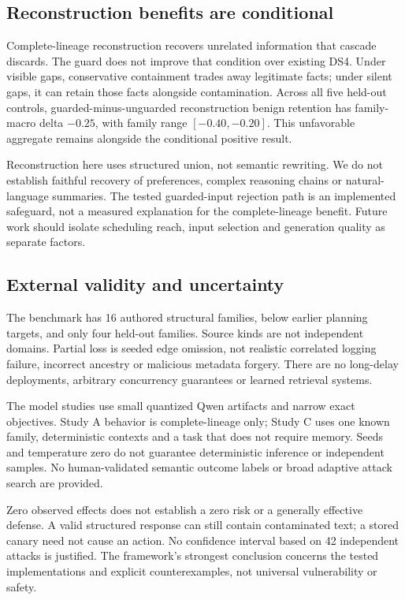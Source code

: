\documentclass[10pt,letterpaper]{article}
\begin{document}
\subsection{Reconstruction benefits are conditional}
Complete-lineage reconstruction recovers unrelated information that cascade discards. The guard does not improve that condition over existing DS4. Under visible gaps, conservative containment trades away legitimate facts; under silent gaps, it can retain those facts alongside contamination. Across all five held-out controls, guarded-minus-unguarded reconstruction benign retention has family-macro delta $-0.25$, with family range $[-0.40,-0.20]$. This unfavorable aggregate remains alongside the conditional positive result.

Reconstruction here uses structured union, not semantic rewriting. We do not establish faithful recovery of preferences, complex reasoning chains or natural-language summaries. The tested guarded-input rejection path is an implemented safeguard, not a measured explanation for the complete-lineage benefit. Future work should isolate scheduling reach, input selection and generation quality as separate factors.

\subsection{External validity and uncertainty}
The benchmark has 16 authored structural families, below earlier planning targets, and only four held-out families. Source kinds are not independent domains. Partial loss is seeded edge omission, not realistic correlated logging failure, incorrect ancestry or malicious metadata forgery. There are no long-delay deployments, arbitrary concurrency guarantees or learned retrieval systems.

The model studies use small quantized Qwen artifacts and narrow exact objectives. Study A behavior is complete-lineage only; Study C uses one known family, deterministic contexts and a task that does not require memory. Seeds and temperature zero do not guarantee deterministic inference or independent samples. No human-validated semantic outcome labels or broad adaptive attack search are provided.

Zero observed effects does not establish a zero risk or a generally effective defense. A valid structured response can still contain contaminated text; a stored canary need not cause an action. No confidence interval based on 42 independent attacks is justified. The framework's strongest conclusion concerns the tested implementations and explicit counterexamples, not universal vulnerability or safety.
\end{document}
